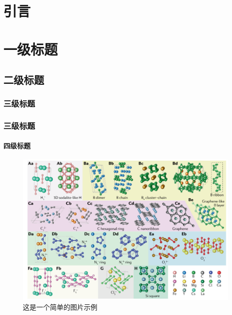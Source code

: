 \documentclass[zihao = -4,linespread = 1.38889, heading = true]{ctexbook} %
\begin{document}
\makecover %


\begin{cnabstract}
  \zhlipsum[1-2]%
\end{cnabstract}


\begin{enabstract}
  \lipsum[1-3]%
\end{enabstract}


\tableofcontents
\cleardoublepage

\setcounter{page}{1}
\chapter{引言}
\zhlipsum[1]

\chapter{一级标题}
\zhlipsum[1]
\section{二级标题}
\zhlipsum[1-3]
\subsection{三级标题}
\zhlipsum[1]
\subsection{三级标题}
\subsubsection{四级标题}
\zhlipsum[1-2]
\begin{figure}
  \centering
  \includegraphics[width = 14cm]{figs/ThisFigure.png}
  \caption{这是一个简单的图片示例}
\end{figure}
\zhlipsum[3-5]
\end{document}
